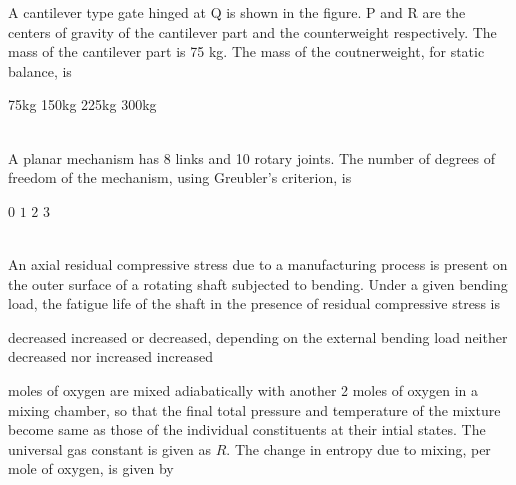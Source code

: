 \documentclass[addpoints,11pt]{exam}
\begin{document}
\begin{questions}
    \question A cantilever type gate hinged at Q is shown in the figure. P and R are the centers of gravity of the cantilever part and the counterweight respectively. The mass of the cantilever part is 75 kg. The mass of the coutnerweight, for static balance, is\\
    
    
    \begin{oneparchoices}
        \choice 75kg
        \choice 150kg
        \choice 225kg
        \choice 300kg
    \end{oneparchoices}\\
    
    \question A planar mechanism has 8 links and 10 rotary joints. The number of degrees of freedom of the mechanism, using Greubler's criterion, is\\

    \begin{oneparchoices}
        \choice $0$
        \choice $1$
        \choice $2$
        \choice $3$
    \end{oneparchoices}\\

    \question An axial residual compressive stress due to a manufacturing process is present on the outer surface of a rotating shaft subjected to bending. Under a given bending load, the fatigue life of the shaft in the presence of residual compressive stress is\\

    \begin{choices}
        \choice decreased
        \choice increased or decreased, depending on the external bending load
        \choice neither decreased nor increased
        \choice increased
    \end{choices}

     moles of oxygen are mixed adiabatically with another 2 moles of oxygen in a mixing chamber, so that the final total pressure and temperature of the mixture become same as those of the individual constituents at their intial states. The universal gas constant is given as $R$. The change in entropy due to mixing, per mole of oxygen, is given by\\


\end{questions}
\end{document}
